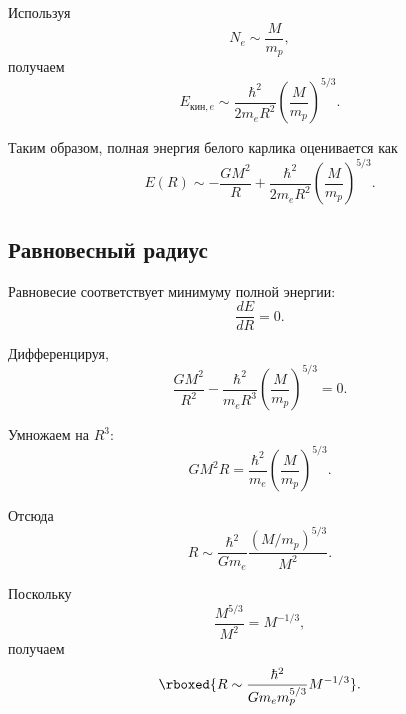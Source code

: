 \documentclass[../final.tex]{subfiles}
\begin{document}
Используя
%
\begin{equation*}
    N_e
    \sim
    \frac{M}{m_p},
\end{equation*}
%
получаем
%
\begin{equation*}
    E_{\text{кин},e}
    \sim
    \frac{\hbar^2}{2m_eR^2}
    \left(
        \frac{M}{m_p}
    \right)^{5/3}.
\end{equation*}

Таким образом, полная энергия белого карлика оценивается как
%
\begin{equation*}
    E(R)
    \sim
    -\frac{GM^2}{R}
    +
    \frac{\hbar^2}{2m_eR^2}
    \left(
        \frac{M}{m_p}
    \right)^{5/3}.
\end{equation*}



\subsection*{Равновесный радиус}

Равновесие соответствует минимуму полной энергии:
%
\begin{equation*}
    \frac{dE}{dR}
    =
    0.
\end{equation*}

Дифференцируя,
%
\begin{equation*}
    \frac{GM^2}{R^2}
    -
    \frac{\hbar^2}{m_eR^3}
    \left(
        \frac{M}{m_p}
    \right)^{5/3}
    =
    0.
\end{equation*}

Умножаем на $R^3$:
%
\begin{equation*}
    GM^2R
    =
    \frac{\hbar^2}{m_e}
    \left(
        \frac{M}{m_p}
    \right)^{5/3}.
\end{equation*}

Отсюда
%
\begin{equation*}
    R
    \sim
    \frac{\hbar^2}{Gm_e}
    \frac{(M/m_p)^{5/3}}{M^2}.
\end{equation*}

Поскольку
%
\begin{equation*}
    \frac{M^{5/3}}{M^2}
    =
    M^{-1/3},
\end{equation*}
%
получаем
%
\begin{equation*}
    \rboxed{
        R
        \sim
        \frac{\hbar^2}
        {Gm_em_p^{5/3}}
        M^{-1/3}
    }.
\end{equation*}
\end{document}
